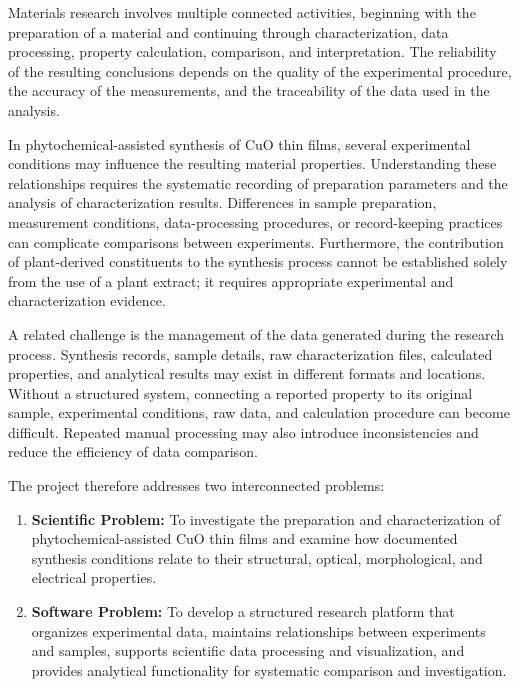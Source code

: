 \documentclass[12pt,a4paper,oneside]{report}
\begin{document}
{{{Materials research involves multiple connected activities, beginning with the preparation of a material and continuing through characterization, data processing, property calculation, comparison, and interpretation. The reliability of the resulting conclusions depends on the quality of the experimental procedure, the accuracy of the measurements, and the traceability of the data used in the analysis.

In phytochemical-assisted synthesis of $\text{CuO}$ thin films, several experimental conditions may influence the resulting material properties. Understanding these relationships requires the systematic recording of preparation parameters and the analysis of characterization results. Differences in sample preparation, measurement conditions, data-processing procedures, or record-keeping practices can complicate comparisons between experiments. Furthermore, the contribution of plant-derived constituents to the synthesis process cannot be established solely from the use of a plant extract; it requires appropriate experimental and characterization evidence.

A related challenge is the management of the data generated during the research process. Synthesis records, sample details, raw characterization files, calculated properties, and analytical results may exist in different formats and locations. Without a structured system, connecting a reported property to its original sample, experimental conditions, raw data, and calculation procedure can become difficult. Repeated manual processing may also introduce inconsistencies and reduce the efficiency of data comparison.

The project therefore addresses two interconnected problems:

\begin{enumerate}
    \item \textbf{Scientific Problem:} To investigate the preparation and characterization of phytochemical-assisted $\text{CuO}$ thin films and examine how documented synthesis conditions relate to their structural, optical, morphological, and electrical properties.
    \item \textbf{Software Problem:} To develop a structured research platform that organizes experimental data, maintains relationships between experiments and samples, supports scientific data processing and visualization, and provides analytical functionality for systematic comparison and investigation.
\end{enumerate}

}}}
\end{document}
